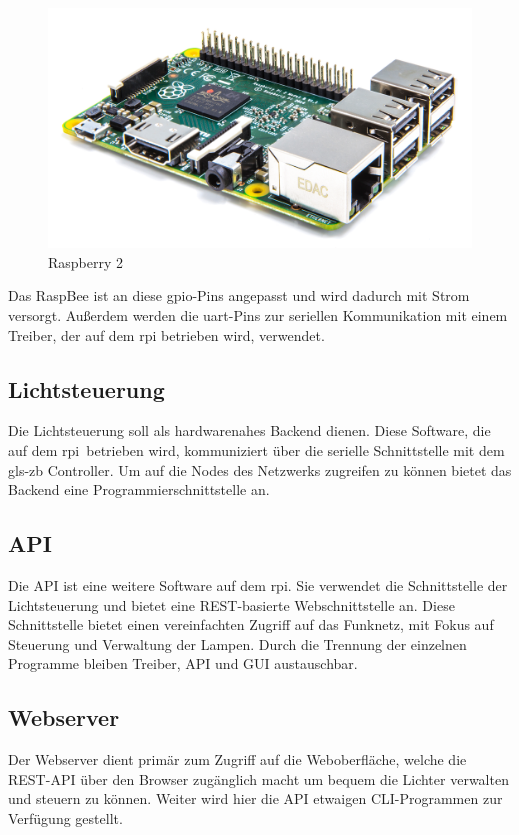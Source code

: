 \documentclass[a4paper,12pt]{article}
\begin{document}
\begin{figure}[h!]
	\centering
	\includegraphics[width=0.7\linewidth]{img/rpi2}
	\caption{Raspberry 2}
\end{figure}

\noindent
Das RaspBee ist an diese \acrshort{gpio}-Pins angepasst und wird dadurch mit Strom versorgt.
Außerdem werden die \acrshort{uart}-Pins zur seriellen Kommunikation mit einem Treiber, der
auf dem \gls{rpi} betrieben wird, verwendet.

\subsection{Lichtsteuerung}

Die Lichtsteuerung soll als hardwarenahes Backend dienen. Diese Software, die auf
dem \gls{rpi} betrieben wird, kommuniziert über die serielle
Schnittstelle mit dem \gls{gls-zb} Controller. Um auf die Nodes des Netzwerks
zugreifen zu können bietet das Backend eine Programmierschnittstelle an.

\subsection{API}

Die API ist eine weitere Software auf dem \gls{rpi}. Sie verwendet
die Schnittstelle der Lichtsteuerung und bietet eine REST-basierte
Webschnittstelle an. Diese Schnittstelle bietet einen vereinfachten Zugriff
auf das Funknetz, mit Fokus auf Steuerung und Verwaltung der Lampen. Durch die
Trennung der einzelnen Programme bleiben Treiber, API und GUI austauschbar.

\subsection{Webserver}

Der Webserver dient primär zum Zugriff auf die Weboberfläche, welche die REST-API
über den Browser zugänglich macht um bequem die Lichter verwalten und steuern
zu können. Weiter wird hier die API etwaigen CLI-Programmen zur Verfügung
gestellt.
\end{document}
